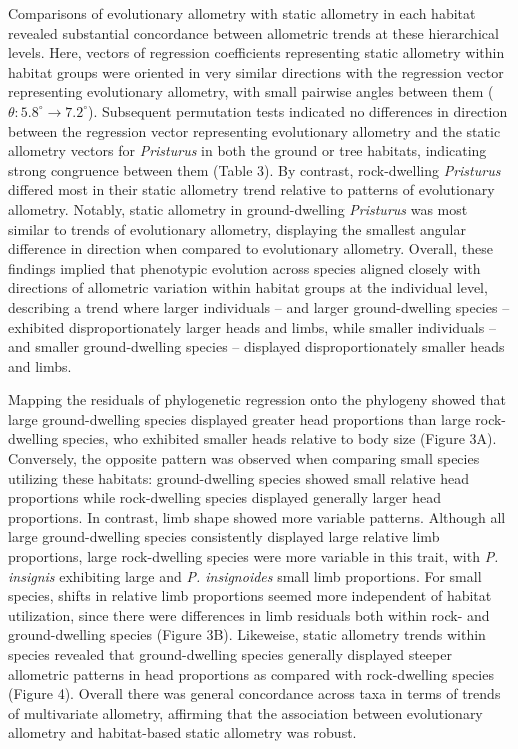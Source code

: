 \documentclass[
  11pt,
]{article}
\begin{document}
Comparisons of evolutionary allometry with static allometry in each
habitat revealed substantial concordance between allometric trends at
these hierarchical levels. Here, vectors of regression coefficients
representing static allometry within habitat groups were oriented in
very similar directions with the regression vector representing
evolutionary allometry, with small pairwise angles between them
(\(\theta: 5.8^\circ\rightarrow7.2^\circ\)). Subsequent permutation
tests indicated no differences in direction between the regression
vector representing evolutionary allometry and the static allometry
vectors for \emph{Pristurus} in both the ground or tree habitats,
indicating strong congruence between them (Table 3). By contrast,
rock-dwelling \emph{Pristurus} differed most in their static allometry
trend relative to patterns of evolutionary allometry. Notably, static
allometry in ground-dwelling \emph{Pristurus} was most similar to trends
of evolutionary allometry, displaying the smallest angular difference in
direction when compared to evolutionary allometry. Overall, these
findings implied that phenotypic evolution across species aligned
closely with directions of allometric variation within habitat groups at
the individual level, describing a trend where larger individuals -- and
larger ground-dwelling species -- exhibited disproportionately larger
heads and limbs, while smaller individuals -- and smaller
ground-dwelling species -- displayed disproportionately smaller heads
and limbs. \hfill\break

Mapping the residuals of phylogenetic regression onto the phylogeny
showed that large ground-dwelling species displayed greater head
proportions than large rock-dwelling species, who exhibited smaller
heads relative to body size (Figure 3A). Conversely, the opposite
pattern was observed when comparing small species utilizing these
habitats: ground-dwelling species showed small relative head proportions
while rock-dwelling species displayed generally larger head proportions.
In contrast, limb shape showed more variable patterns. Although all
large ground-dwelling species consistently displayed large relative limb
proportions, large rock-dwelling species were more variable in this
trait, with \emph{P. insignis} exhibiting large and \emph{P.
insignoides} small limb proportions. For small species, shifts in
relative limb proportions seemed more independent of habitat
utilization, since there were differences in limb residuals both within
rock- and ground-dwelling species (Figure 3B). Likeweise, static
allometry trends within species revealed that ground-dwelling species
generally displayed steeper allometric patterns in head proportions as
compared with rock-dwelling species (Figure 4). Overall there was
general concordance across taxa in terms of trends of multivariate
allometry, affirming that the association between evolutionary allometry
and habitat-based static allometry was robust. \hfill\break
\end{document}
